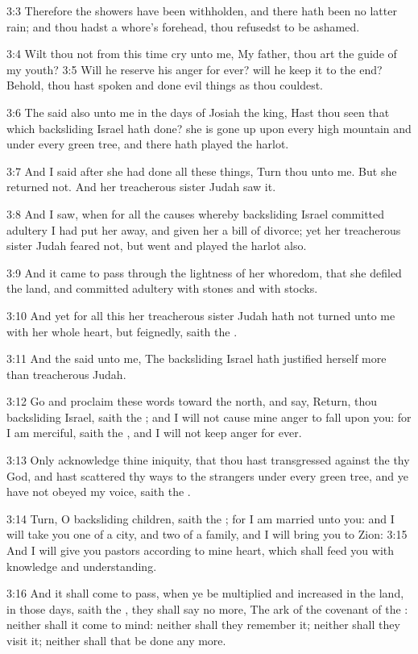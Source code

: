 3:3 Therefore the showers have been withholden, and there hath been no
latter rain; and thou hadst a whore's forehead, thou refusedst to be
ashamed.

3:4 Wilt thou not from this time cry unto me, My father, thou art the
guide of my youth?  3:5 Will he reserve his anger for ever? will he
keep it to the end?  Behold, thou hast spoken and done evil things as
thou couldest.

3:6 The \LORD said also unto me in the days of Josiah the king, Hast
thou seen that which backsliding Israel hath done? she is gone up upon
every high mountain and under every green tree, and there hath played
the harlot.

3:7 And I said after she had done all these things, Turn thou unto me.
But she returned not. And her treacherous sister Judah saw it.

3:8 And I saw, when for all the causes whereby backsliding Israel
committed adultery I had put her away, and given her a bill of
divorce; yet her treacherous sister Judah feared not, but went and
played the harlot also.

3:9 And it came to pass through the lightness of her whoredom, that
she defiled the land, and committed adultery with stones and with
stocks.

3:10 And yet for all this her treacherous sister Judah hath not turned
unto me with her whole heart, but feignedly, saith the \LORD.

3:11 And the \LORD said unto me, The backsliding Israel hath justified
herself more than treacherous Judah.

3:12 Go and proclaim these words toward the north, and say, Return,
thou backsliding Israel, saith the \LORD; and I will not cause mine
anger to fall upon you: for I am merciful, saith the \LORD, and I will
not keep anger for ever.

3:13 Only acknowledge thine iniquity, that thou hast transgressed
against the \LORD thy God, and hast scattered thy ways to the strangers
under every green tree, and ye have not obeyed my voice, saith the
\LORD.

3:14 Turn, O backsliding children, saith the \LORD; for I am married
unto you: and I will take you one of a city, and two of a family, and
I will bring you to Zion: 3:15 And I will give you pastors according
to mine heart, which shall feed you with knowledge and understanding.

3:16 And it shall come to pass, when ye be multiplied and increased in
the land, in those days, saith the \LORD, they shall say no more, The
ark of the covenant of the \LORD: neither shall it come to mind:
neither shall they remember it; neither shall they visit it; neither
shall that be done any more.


